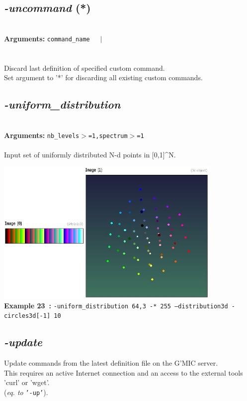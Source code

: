 \documentclass[a4paper,11pt,twoside]{book}
\begin{document}
\subsection{\emph{-uncommand} (*)}\vspace*{-0.5em}
~\\\textbf{Arguments: } 
{\small \texttt{command\_name}}~~~$|$\\
\hspace*{2.2cm}{\small \texttt{*}}\\~\\
Discard last definition of specified custom command.
~\\Set argument to '*' for discarding all existing custom commands.


\subsection{\emph{-uniform\_distribution} }\vspace*{-0.5em}
~\\\textbf{Arguments: } 
{\small \texttt{nb\_levels$>$=1,spectrum$>$=1}}\\~\\
Input set of uniformly distributed N-d points in [0,1]\textasciicircum N.
\begin{center}\includegraphics[keepaspectratio=true,height=7cm,width=\textwidth]{img/gmic_def23.jpg}\\
{\footnotesize \textbf{Example 23~:} \texttt{-uniform\_distribution 64,3 -* 255 --distribution3d -circles3d[-1] 10}}
\end{center}

\subsection{\emph{-update} }\vspace*{-0.5em}
Update commands from the latest definition file on the G'MIC server.
~\\This requires an active Internet connection and an access to the external
tools 'curl' or 'wget'.
~\\(\emph{eq. to} {\small \texttt{'-up'}}).
\end{document}
